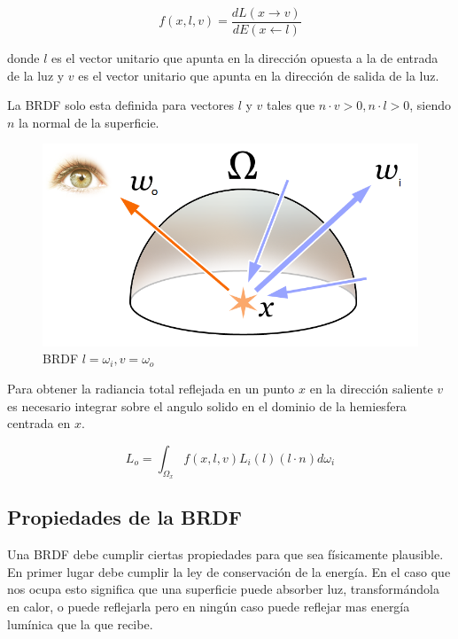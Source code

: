 \begin{equation}
f(x, l, v)=\frac{dL(x \to v)}{dE(x \gets l)} 
\end{equation}

donde $l$ es el vector unitario que apunta en la dirección opuesta a la de entrada de la luz y $v$ es el vector unitario que apunta en la dirección de salida de la luz.

La BRDF solo esta definida para vectores $l$ y $v$ tales que $n \cdot v > 0, n \cdot l > 0$, siendo $n$ la normal de la superficie.

\begin{figure}[h]
\centering
\includegraphics[scale=0.5]{Rendering_eq.png}
\caption{BRDF $l = \omega_i, v = \omega_o$ }
\end{figure}


Para obtener la radiancia total reflejada en un punto $x$ en la dirección saliente $v$ es necesario integrar sobre el angulo solido en el dominio de la hemiesfera centrada en $x$.

\begin{equation}
\label{eq:radiance_integral}
L _ o = \int_{\Omega_x} f(x, l, v) L_i(l) (l \cdot n) d\omega_i 
\end{equation}

\clearpage

\subsection{Propiedades de la BRDF}

Una BRDF debe cumplir ciertas propiedades para que sea físicamente plausible.
En primer lugar debe cumplir la ley de conservación de la energía. En el caso que nos ocupa esto significa que una superficie puede absorber luz, transformándola en calor, o puede reflejarla pero en ningún caso puede reflejar mas energía lumínica que la que recibe.

